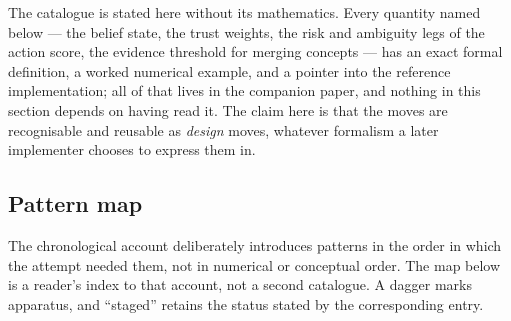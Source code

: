The catalogue is stated here without its mathematics.  Every quantity named
below --- the belief state, the trust weights, the risk and ambiguity legs of
the action score, the evidence threshold for merging concepts --- has an exact
formal definition, a worked numerical example, and a pointer into the reference
implementation; all of that lives in the companion paper, and nothing in this
section depends on having read it.  The claim here is that the moves are
recognisable and reusable as \emph{design} moves, whatever formalism a later
implementer chooses to express them in.

\ifdefined\plopearlyoverview
\subsection*{Pattern map}

The chronological account deliberately introduces patterns in the order in
which the attempt needed them, not in numerical or conceptual order.  The map
below is a reader's index to that account, not a second catalogue.  A dagger
marks apparatus, and ``staged'' retains the status stated by the corresponding
entry.

